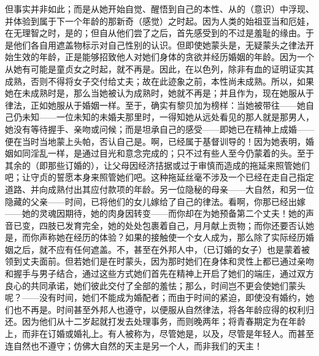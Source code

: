 但事实并非如此；而是从她开始自觉、醒悟到自己的本性、从的（意识）中浮现、并体验到属于下一个年龄的那新奇（感觉）之时起。因为人类的始祖亚当和厄娃，在无理智之时，是的；但自从他们尝了之后，首先感受到的不过是羞耻的缘由。于是他们各自用遮盖物标示对自己性别的认识。但即使她蒙头是，无疑蒙头之律法开始生效的年龄，正是能够招致他人对她们身体的贪欲并经历婚姻的年龄。因为一个从她有可能是童贞女之时起，就不再是。因此，在以色列，除非有血的证明证实其成熟，否则不得将女子交付给丈夫；故在此迹象之前，本性尚未成熟。所以，如果她在未成熟时是，那么当她被认为成熟时，她就不再是；并且作为，现在她服从于律法，正如她服从于婚姻一样。至于，确实有黎贝加为榜样：当她被带往——她自己仍未知——一位未知的未婚夫那里时，一得知她从远处看见的那人就是那男人，她没有等待握手、亲吻或问候；而是坦承自己的感受——即她已在精神上成婚——便在当时当地蒙上头帕，否认自己是。啊，已经属于基督训导的！因为她表明，婚姻如同淫乱一样，是通过目光和意念完成的；只不过有些人至今仍蒙着的头。至于其余的（即那些订婚的），让父母因经济拮据或过于审慎而造成的拖延来照管她们吧；让守贞的誓愿本身来照管她们吧。这种拖延丝毫不涉及一个已经在走自己指定道路、并向成熟付出其应付款项的年龄。另一位隐秘的母亲——大自然，和另一位隐藏的父亲——时间，已将他们的女儿嫁给了自己的律法。看啊，你那已经出嫁——她的灵魂因期待，她的肉身因转变——而你却在为她预备第二个丈夫！她的声音已变，四肢已发育完全，她的处处包裹着自己，月月献上贡物；而你还要否认她是，而你声称她在经历的体验？如果的接触使一个女人成为，那么除了实际经历婚姻之后，就不应有任何遮盖。不，甚至在外邦人中，（已订婚的女子）也是蒙着被领到丈夫面前。但若她们是在时蒙头，因为那时她们在身体和灵性上都已通过亲吻和握手与男子结合，通过这些方式她们首先在精神上开启了她们的端庄，通过双方良心的共同承诺，她们彼此交付了全部的羞怯；那么，时间岂不更会使她们蒙头呢？——没有时间，她们不能成为婚配者；而由于时间的紧迫，即使没有婚约，她们也不再是。时间甚至外邦人也遵守，以便服从自然律法，将各年龄应得的权利归还。因为他们从十二岁起就打发去处理事务，而则晚两年；将青春期定为在年龄上，而非在订婚或婚礼上。有人被称为，尽管她是，以及，尽管是年轻人。而甚至连自然也不遵守；仿佛大自然的天主是另一个人，而非我们的天主！\par



